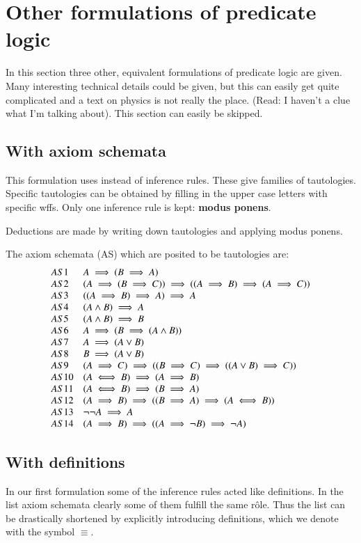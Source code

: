 \section{Other formulations of predicate logic}
In this section three other, equivalent formulations of predicate logic are given. Many interesting technical details could be given, but this can easily get quite complicated and a text on physics is not really the place. (Read: I haven't a clue what I'm talking about). This section can easily be skipped.
\subsection{With axiom schemata}
This formulation uses  instead of inference rules. These give families of tautologies. Specific tautologies can be obtained by filling in the upper case letters with specific wffs. Only one inference rule is kept: \textbf{modus ponens}.

Deductions are made by writing down tautologies and applying modus ponens.

The axiom schemata (AS) which are posited to be tautologies are:
\[\begin{array}{l l}
AS1 & A \implies (B\implies A) \\
AS2 & (A \implies (B \implies C))\implies((A\implies B)\implies(A\implies C)) \\
AS3 & ((A\implies B)\implies A)\implies A \\
AS4 & (A\land B) \implies A \\
AS5 & (A\land B) \implies B \\
AS6 & A\implies(B\implies(A\land B)) \\
AS7 & A \implies (A\lor B) \\
AS8 & B \implies (A\lor B) \\
AS9 & (A\implies C)\implies ((B\implies C)\implies ((A\lor B)\implies C)) \\
AS10 & (A\iff B)\implies (A\implies B) \\
AS11 & (A\iff B) \implies (B\implies A) \\
AS12 & (A\implies B)\implies ((B\implies A)\implies (A\iff B)) \\
AS13 & \neg \neg A \implies A \\
AS14 & (A\implies B)\implies ((A\implies \neg B)\implies \neg A)
\end{array}\]
\subsection{With definitions}
In our first formulation some of the inference rules acted like definitions. In the list axiom schemata clearly some of them fulfill the same rôle. Thus the list can be drastically shortened by explicitly introducing definitions, which we denote with the symbol $\equiv$.

